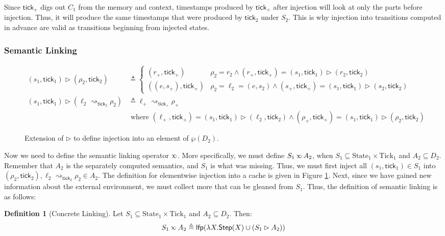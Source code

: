 \documentclass{article}
\theoremstyle{definition}
\newtheorem{definition}{Definition}[section]
\newcommand*{\State}{\text{State}}
\newcommand*{\Tick}{\text{Tick}}
\newcommand*{\semarrow}{\rightsquigarrow}
\newcommand*{\semlink}{\mathbin{\rotatebox[origin=c]{180}{$\propto$}}}
\newcommand*{\tick}{\mathsf{tick}}
\begin{document}
Since $\tick_+$ digs out $C_1$ from the memory and context, timestamps produced by $\tick_+$ after injection will look at only the parts before injection.
Thus, it will produce the same timestamps that were produced by $\tick_2$ under $S_2$.
This is why injection into transitions computed in advance are valid as transitions beginning from injected states.

\subsubsection{Semantic Linking}
\begin{figure}[h!]
  \begin{align*}
    (s_1,\tick_1)\rhd(\rho_2,\tick_2)                  & \triangleq
    \begin{cases}
      (r_+,\tick_+)     & \rho_2=r_2\wedge(r_+,\tick_+)=(s_1,\tick_1)\rhd(r_2,\tick_2)            \\
      ((e,s_+),\tick_+) & \rho_2=\ell_2=(e,s_2)\wedge(s_+,\tick_+)=(s_1,\tick_1)\rhd(s_2,\tick_2)
    \end{cases} \\
    (s_1,\tick_1)\rhd(\ell_2\semarrow_{\tick_2}\rho_2) & \triangleq
    \ell_+\semarrow_{\tick_+}\rho_+                                                             \\
                                                       & \text{ where }
    (\ell_+,\tick_+)=(s_1,\tick_1)\rhd(\ell_2,\tick_2)\wedge
    (\rho_+,\tick_+)=(s_1,\tick_1)\rhd(\rho_2,\tick_2)
  \end{align*}
  \caption{Extension of $\rhd$ to define injection into an element of $\wp(D_2)$.}
  \label{fig:extinject}
\end{figure}
Now we need to define the semantic linking operator $\semlink$.
More specifically, we must define $S_1\semlink A_2$, when $S_1\subseteq\State_1\times\Tick_1$ and $A_2\subseteq D_2$.
Remember that $A_2$ is the separately computed semantics, and $S_1$ is what was missing.
Thus, we must first inject all $(s_1,\tick_1)\in S_1$ into $(\rho_2,\tick_2),\ell_2\semarrow_{\tick_2}\rho_2\in A_2$.
The definition for elementwise injection into a cache is given in Figure \ref{fig:extinject}.
Next, since we have gained new information about the external environment, we must collect more that can be gleaned from $S_1$.
Thus, the definition of semantic linking is as follows:
\begin{definition}[Concrete Linking]
  Let $S_1\subseteq\State_1\times\Tick_1$ and $A_2\subseteq D_2$.
  Then:
  \[
    S_1\semlink A_2\triangleq
    \mathsf{lfp}(\lambda X.\mathsf{Step}(X)\cup(S_1\rhd A_2))
  \]
\end{definition}
\end{document}

